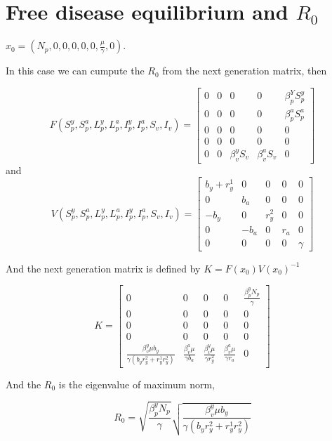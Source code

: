 \section{Free disease equilibrium and $R_0$}

	$x_0=(N_p,0,0,0,0,0,\frac{\mu}{\gamma},0)$.

	In this case we can cumpute the $R_0$ from the next generation matrix, then

	\begin{equation}
	F(S^y_p,S^a_p,L^y_p,L^a_p,I^y_p,I^a_p,S_v,I_v) =
	\begin{bmatrix} 0 & 0 & 0 & 0 & \beta^Y_p S^y_p \\ 0 & 0 & 0 & 0 & \beta^a_p S^a_p \\ 0 & 0 & 0 & 0 & 0 \\ 0 & 0 & 0 & 0 & 0 \\ 0 & 0 & \beta^y_v S_v & \beta^a_v S_v & 0
	\end{bmatrix}
	\end{equation}
	and 
	\begin{equation}
	V(S^y_p,S^a_p,L^y_p,L^a_p,I^y_p,I^a_p,S_v,I_v) =
	\begin{bmatrix} b_y + r^1_y & 0 & 0 & 0 & 0 \\ 0 & b_a & 0 & 0 & 0 \\ -b_y & 0 & r^2_y & 0 & 0 \\ 0 & -b_a & 0 & r_a & 0 \\ 0 & 0 & 0 & 0 & \gamma \end{bmatrix}
	\end{equation}

	And the next generation matrix is defined by $K = F(x_0)V(x_0)^{-1}$

	\begin{equation}
	K =
	\begin{bmatrix} 0 & 0 & 0 & 0 & \frac{\beta^y_p N_p}{\gamma} \\ 0 & 0 & 0 & 0 & 0 \\ 0 & 0 & 0 & 0 & 0 \\ 0 & 0 & 0 & 0 & 0 \\ \frac{\beta^y_v\mu b_y}{\gamma(b_yr^2_y+r^1_yr^2_y)} & \frac{\beta^a_v\mu }{\gamma b_a} & \frac{\beta^y_v\mu }{\gamma r^2_y} & \frac{\beta^a_v\mu }{\gamma r_a} & 0 \end{bmatrix}
	\end{equation}

	And the $R_0$ is the eigenvalue of maximum norm,

	\begin{equation}
		R_0= \sqrt{\frac{\beta^y_p N_p}{\gamma}}\sqrt{\frac{\beta^y_v\mu b_y}{\gamma(b_yr^2_y+r^1_yr^2_y)}}
	\end{equation}
